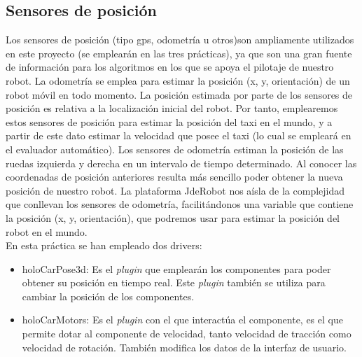 \subsection{Sensores de posición}
Los sensores de posición (tipo \acrshort{gps}, odometría u otros)son ampliamente utilizados en este proyecto (se emplearán en las tres prácticas), ya que son una gran fuente de información para los algoritmos en los que se apoya el pilotaje de nuestro robot. La odometría se emplea para estimar la posición (x, y, orientación) de un robot móvil en todo momento. La posición estimada por parte de los sensores de posición es relativa a la localización inicial del robot. Por tanto, emplearemos estos sensores de posición para estimar la posición del taxi en el mundo, y a partir de este dato estimar la velocidad que posee el taxi (lo cual se empleará en el evaluador automático).  Los sensores de odometría estiman la posición de las ruedas izquierda y derecha en un intervalo de tiempo determinado. Al conocer las coordenadas de posición anteriores resulta más sencillo poder obtener la nueva posición de nuestro robot. La plataforma JdeRobot nos aísla de la complejidad que conllevan los sensores de odometría, facilitándonos una variable que contiene la posición (x, y, orientación), que podremos usar para estimar la posición del robot en el mundo.\\


En esta práctica se han empleado dos drivers: 

\begin{itemize}
\item holoCarPose3d: Es el \textit{plugin} que emplearán los componentes para poder obtener su posición en tiempo real. Este \textit{plugin} también se utiliza para cambiar la posición de los componentes.
\item holoCarMotors: Es el \textit{plugin} con el que interactúa el componente, es el que permite dotar al componente de velocidad, tanto velocidad de tracción como velocidad de rotación. También modifica los datos de la interfaz de usuario.
\end{itemize}

